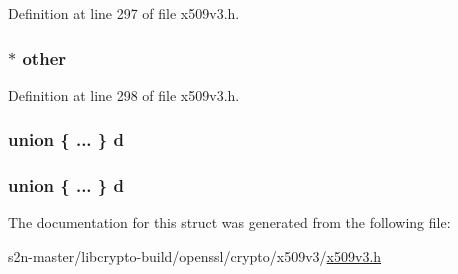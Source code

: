 Definition at line 297 of file x509v3.\+h.

\subsubsection[{\texorpdfstring{other}{other}}]{$\ast$ other}\hypertarget{struct_p_o_l_i_c_y_q_u_a_l_i_n_f_o__st_a913b5f8be6ebbc8d847d25c9279ee3d2}{}\label{struct_p_o_l_i_c_y_q_u_a_l_i_n_f_o__st_a913b5f8be6ebbc8d847d25c9279ee3d2}


Definition at line 298 of file x509v3.\+h.

\subsubsection[{\texorpdfstring{d}{d}}]{\setlength{\rightskip}{0pt plus 5cm}union \{ ... \}   d}\hypertarget{struct_p_o_l_i_c_y_q_u_a_l_i_n_f_o__st_ad2682d0c963be835af0894093600826e}{}\label{struct_p_o_l_i_c_y_q_u_a_l_i_n_f_o__st_ad2682d0c963be835af0894093600826e}
\subsubsection[{\texorpdfstring{d}{d}}]{\setlength{\rightskip}{0pt plus 5cm}union \{ ... \}   d}\hypertarget{struct_p_o_l_i_c_y_q_u_a_l_i_n_f_o__st_a1e573c6e5123a202306b3cce655f24c2}{}\label{struct_p_o_l_i_c_y_q_u_a_l_i_n_f_o__st_a1e573c6e5123a202306b3cce655f24c2}


The documentation for this struct was generated from the following file\+:\begin{DoxyCompactItemize}
\item 
s2n-\/master/libcrypto-\/build/openssl/crypto/x509v3/\hyperlink{crypto_2x509v3_2x509v3_8h}{x509v3.\+h}\end{DoxyCompactItemize}
